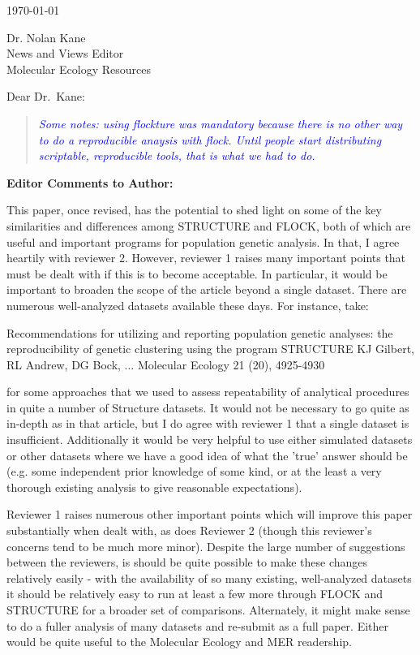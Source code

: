 \documentclass[11pt]{letter}
\date{}
\newcommand{\reply}[1]{\begin{quotation}\small\sl\textcolor{blue}{#1}\end{quotation}}
\begin{document}
\begin{letter}{ \today 

Dr. Nolan Kane\\
News and Views Editor\\
Molecular Ecology Resources \\
}

\opening{Dear Dr.~Kane:}

\reply{Some notes:  using flockture was mandatory because there is no other way to do a reproducible anaysis
with {\sc flock}.  Until people start distributing scriptable, reproducible tools, that is what we 
had to do.}


{\bf Editor Comments to Author:}


This paper, once revised, has the potential to shed light on some of the key similarities and differences among STRUCTURE and FLOCK, both of which are useful and important programs for population genetic analysis.  In that, I agree heartily with reviewer 2. However, reviewer 1 raises many important points that must be dealt with if this is to become acceptable. In particular, it would be important to broaden the scope of the article beyond a single dataset.  There are numerous well-analyzed datasets available these days.  For instance, take:

Recommendations for utilizing and reporting population genetic analyses: the reproducibility of genetic clustering using the program STRUCTURE
KJ Gilbert, RL Andrew, DG Bock, ...
Molecular Ecology 21 (20), 4925-4930

for some approaches that we used to assess repeatability of analytical procedures in quite a number of Structure datasets.  It would not be necessary to go quite as in-depth as in that article, but I do agree with reviewer 1 that a single dataset is insufficient.  Additionally it would be very helpful to use either simulated datasets or other datasets where we have a good idea of what the 'true' answer should be (e.g. some independent prior knowledge of some kind, or at the least a very thorough existing analysis to give reasonable expectations).

Reviewer 1 raises numerous other important points which will improve this paper substantially when dealt with, as does Reviewer 2 (though this reviewer's concerns tend to be much more minor). Despite the large number of suggestions between the reviewers, is should be quite possible to make these changes relatively easily - with the availability of so many existing, well-analyzed datasets it should be relatively easy to run at least a few more through FLOCK and STRUCTURE for a broader set of comparisons.  Alternately, it might make sense to do a fuller analysis of many datasets and re-submit as a full paper. Either would be quite useful to the Molecular Ecology and MER readership.


\end{letter}
\end{document}
